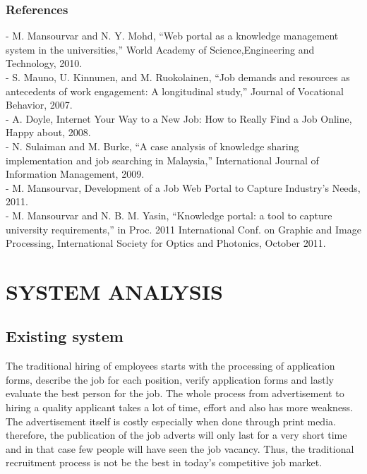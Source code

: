 \documentclass[a4paper,12pt]{report}
\begin{document}
\subsection{References}
\hspace*{12pt}
\subitem - M. Mansourvar and N. Y. Mohd, “Web portal as a knowledge management system in the universities,” World Academy of Science,Engineering and Technology, 2010.\\
\subitem - S. Mauno, U. Kinnunen, and M. Ruokolainen, “Job demands and resources as antecedents of work engagement: A longitudinal study,” Journal of Vocational Behavior, 2007.\\
\subitem - A. Doyle, Internet Your Way to a New Job: How to Really Find a Job Online, Happy about, 2008.\\
\subitem - N. Sulaiman and M. Burke, “A case analysis of knowledge sharing implementation and job searching in Malaysia,” International Journal of Information Management, 2009.\\
\subitem - M. Mansourvar, Development of a Job Web Portal to Capture Industry’s Needs, 2011.\\
\subitem - M. Mansourvar and N. B. M. Yasin, “Knowledge portal: a tool to capture university requirements,” in Proc. 2011 International Conf. on Graphic and Image Processing, International Society for Optics and Photonics, October 2011.

\pagebreak

\chapter{SYSTEM ANALYSIS}
\section{Existing system}

\hspace*{12pt}The traditional hiring of employees starts with the processing of application forms, describe the job for each position, verify application forms and lastly evaluate the best person for the job. The whole process from advertisement to hiring a quality applicant takes a lot of time, effort and also has more weakness. The advertisement itself is costly especially when done through print media. therefore, the publication of the job adverts will only last for a very short time and in that case few people will have seen the job vacancy. Thus, the traditional recruitment process is not be the best in today's competitive job market.\\
\end{document}
